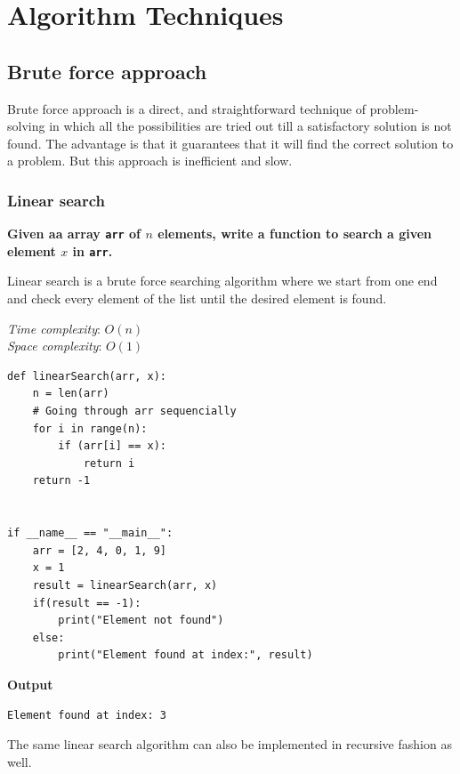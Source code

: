 \documentclass[a4paper,11pt]{book}
\begin{document}
\newpage
\chapter{Algorithm Techniques}

\section{Brute force approach}

\noindent Brute force approach is a direct, and straightforward technique of problem-solving in which all the possibilities are tried out till a satisfactory solution is not found. The advantage is that it guarantees that it will find the correct solution to a problem. But this approach is inefficient and slow.

\subsection{Linear search}
\textbf{Given aa array \lstinline{arr} of $n$ elements, write a function to search a given element $x$ in \lstinline{arr}.}
\vspace{5mm}

\noindent Linear search is a brute force searching algorithm where we start from one end and check every element of the list until the desired element is found. 

\vspace{5mm}

\noindent \textit{Time complexity}: $O(n)$\\
\noindent \textit{Space complexity}: $O(1)$

\begin{lstlisting}
def linearSearch(arr, x):
    n = len(arr)
    # Going through arr sequencially
    for i in range(n):
        if (arr[i] == x):
            return i
    return -1


if __name__ == "__main__":
    arr = [2, 4, 0, 1, 9]
    x = 1
    result = linearSearch(arr, x)
    if(result == -1):
        print("Element not found")
    else:
        print("Element found at index:", result)
\end{lstlisting}
\textbf{Output}
\begin{lstlisting}
Element found at index: 3
\end{lstlisting}

\noindent The same linear search algorithm can also be implemented in recursive fashion as well.

\vspace{5mm}
\end{document}
